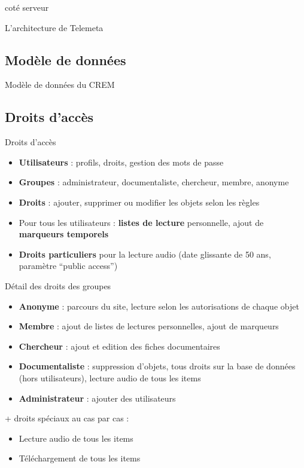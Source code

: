 \documentclass[a4paper,11pt,french]{article}
\begin{document}
 coté serveur

L'architecture de Telemeta
  \begin{center}
   \vspace{-0.2cm}
  \end{center}

\subsection{Modèle de données}

Modèle de données du CREM
  \begin{center}
   \vspace{-0.2cm}
  \end{center}

\subsection{Droits d'accès}

Droits d'accès
\begin{itemize}
 \item \textbf{Utilisateurs} : profils, droits, gestion des mots de passe
 \item \textbf{Groupes} : administrateur, documentaliste, chercheur, membre, anonyme
 \item \textbf{Droits} : ajouter, supprimer ou modifier les objets selon les règles
 \item Pour tous les utilisateurs : \textbf{listes de lecture} personnelle, ajout de \textbf{marqueurs temporels}
 \item \textbf{Droits particuliers} pour la lecture audio (date glissante de 50 ans, paramètre ``public access'')
\end{itemize}

Détail des droits des groupes
\begin{itemize}
 \item \textbf{Anonyme} : parcours du site, lecture selon les autorisations de chaque objet
 \item \textbf{Membre} : ajout de listes de lectures personnelles, ajout de marqueurs
 \item \textbf{Chercheur} : ajout et edition des fiches documentaires
 \item \textbf{Documentaliste} : suppression d'objets, tous droits sur la base de données (hors utilisateurs), lecture audio de tous les items
 \item \textbf{Administrateur} : ajouter des utilisateurs
\end{itemize}
\vspace{5mm}
+ droits spéciaux au cas par cas :
\begin{itemize}
 \item Lecture audio de tous les items
 \item Téléchargement de tous les items
\end{itemize}
\end{document}
